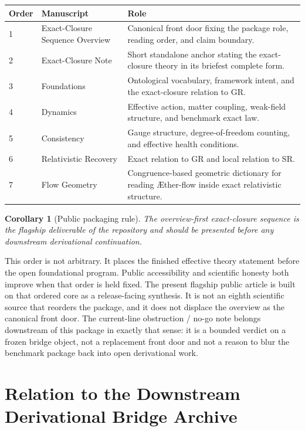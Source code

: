 \documentclass[11pt]{article}
\newcommand{\Aflow}{\AE{}ther-flow}
\newtheorem{corollary}{Corollary}
\begin{document}
\begin{center}
\begin{tabular}{p{} p{} p{}}
\toprule
\textbf{Order} & \textbf{Manuscript} & \textbf{Role} \\
\midrule
1 & Exact-Closure Sequence Overview & Canonical front door fixing the package role, reading order, and claim boundary. \\
2 & Exact-Closure Note & Short standalone anchor stating the exact-closure theory in its briefest complete form. \\
3 & Foundations & Ontological vocabulary, framework intent, and the exact-closure relation to GR. \\
4 & Dynamics & Effective action, matter coupling, weak-field structure, and benchmark exact law. \\
5 & Consistency & Gauge structure, degree-of-freedom counting, and effective health conditions. \\
6 & Relativistic Recovery & Exact relation to GR and local relation to SR. \\
7 & Flow Geometry & Congruence-based geometric dictionary for reading \Aflow{} inside exact relativistic structure. \\
\bottomrule
\end{tabular}
\end{center}

\begin{corollary}[Public packaging rule]
The overview-first exact-closure sequence is the flagship deliverable of the repository and should be presented before any downstream derivational continuation.
\end{corollary}

This order is not arbitrary. It places the finished effective theory statement before the open foundational program. Public accessibility and scientific honesty both improve when that order is held fixed.
The present flagship public article is built on that ordered core as a release-facing synthesis. It is not an eighth scientific source that reorders the package, and it does not displace the overview as the canonical front door.
The current-line obstruction / no-go note belongs downstream of this package in exactly that sense: it is a bounded verdict on a frozen bridge object, not a replacement front door and not a reason to blur the benchmark package back into open derivational work.

\section{Relation to the Downstream Derivational Bridge Archive}
\end{document}
